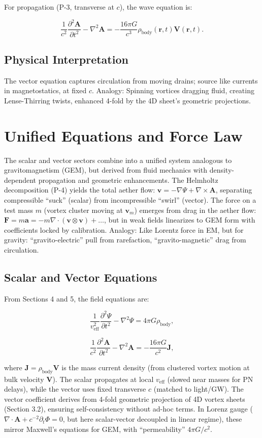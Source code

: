 \documentclass{article}
\begin{document}
For propagation (P-3, transverse at $c$), the wave equation is:

\[
\frac{1}{c^2} \frac{\partial^2 \mathbf{A}}{\partial t^2} - \nabla^2 \mathbf{A} = -\frac{16\pi G}{c^3} \rho_{\text{body}}(\mathbf{r}, t) \mathbf{V}(\mathbf{r}, t).
\]

\subsection{Physical Interpretation}

The vector equation captures circulation from moving drains; source like currents in magnetostatics, at fixed $c$. Analogy: Spinning vortices dragging fluid, creating Lense-Thirring twists, enhanced 4-fold by the 4D sheet's geometric projections.

\section{Unified Equations and Force Law}

The scalar and vector sectors combine into a unified system analogous to gravitomagnetism (GEM), but derived from fluid mechanics with density-dependent propagation and geometric enhancements. The Helmholtz decomposition (P-4) yields the total aether flow: $\mathbf{v} = -\nabla \Psi + \nabla \times \mathbf{A}$, separating compressible ``suck'' (scalar) from incompressible ``swirl'' (vector). The force on a test mass $m$ (vortex cluster moving at $\mathbf{v}_m$) emerges from drag in the aether flow: $\mathbf{F} = m \mathbf{a} = -m \nabla \cdot (\mathbf{v} \otimes \mathbf{v}) + \dots$, but in weak fields linearizes to GEM form with coefficients locked by calibration. Analogy: Like Lorentz force in EM, but for gravity: ``gravito-electric'' pull from rarefaction, ``gravito-magnetic'' drag from circulation.

\subsection{Scalar and Vector Equations}

From Sections 4 and 5, the field equations are:

\[
\frac{1}{v_{\text{eff}}^2} \frac{\partial^2 \Psi}{\partial t^2} - \nabla^2 \Psi = 4\pi G \rho_{\text{body}},
\]

\[
\frac{1}{c^2} \frac{\partial^2 \mathbf{A}}{\partial t^2} - \nabla^2 \mathbf{A} = -\frac{16\pi G}{c^2} \mathbf{J},
\]

where $\mathbf{J} = \rho_{\text{body}} \mathbf{V}$ is the mass current density (from clustered vortex motion at bulk velocity $\mathbf{V}$). The scalar propagates at local $v_{\text{eff}}$ (slowed near masses for PN delays), while the vector uses fixed transverse $c$ (matched to light/GW). The vector coefficient derives from 4-fold geometric projection of 4D vortex sheets (Section 3.2), ensuring self-consistency without ad-hoc terms. In Lorenz gauge ($\nabla \cdot \mathbf{A} + c^{-2} \partial_t \Phi = 0$, but here scalar-vector decoupled in linear regime), these mirror Maxwell's equations for GEM, with ``permeability'' $4\pi G / c^2$.
\end{document}
